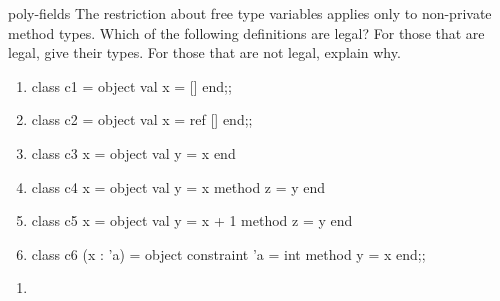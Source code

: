 %
%
%
%

\exercises

\begin{exercise}{poly-fields}
The restriction about free type variables applies only to non-private method
types.  Which of the following definitions are legal?  For those that
are legal, give their types.  For those that are not legal, explain
why.

\begin{enumerate}
\item

\begin{ocamllisting}
class c1 = object val x = [] end;;
\end{ocamllisting}

\item

\begin{ocamllisting}
class c2 = object val x = ref [] end;;
\end{ocamllisting}

\item

\begin{ocamllisting}
class c3 x = object val y = x end
\end{ocamllisting}

\item

\begin{ocamllisting}
class c4 x = object val y = x method z = y end
\end{ocamllisting}

\item

\begin{ocamllisting}
class c5 x = object val y = x + 1 method z = y end
\end{ocamllisting}

\item

\begin{ocamllisting}
class c6 (x : 'a) = object constraint 'a = int method y = x end;;
\end{ocamllisting}
\end{enumerate}

\begin{answer}\ifanswers
\begin{enumerate}
\item


\end{enumerate}
\end{answer}
\end{exercise}
